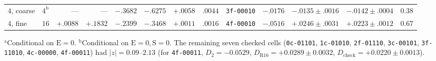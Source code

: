 \begin{table}[htbp]
\begin{tabular}{llrrrrrr|lrrrl}
$4$, coarse & $4^{\mathrm{b}}$ & --- & --- & $-.3682$ & $-.6275$ & $+.0058$ & $.0044$ & \texttt{3f-00010} & $-.0176$ & $-.0135 \pm .0016$ & $-.0142 \pm .0004$ & $0.38$\\
$4$, fine & $16$ & $+.0088$ & $+.1832$ & $-.2399$ & $-.3468$ & $+.0011$ & $.0016$ & \texttt{4f-00010} & $-.0516$ & $+.0246 \pm .0031$ & $+.0223 \pm .0012$ & $0.67$\\\bottomrule
\end{tabular}
\par\smallskip\raggedright\footnotesize
$^{\mathrm{a}}$Conditional on $\mathrm{E} = 0$. $^{\mathrm{b}}$Conditional on $\mathrm{E} = 0, \mathrm{S} = 0$. The remaining seven checked cells (\texttt{0c-01101}, \texttt{1c-01010}, \texttt{2f-01110}, \texttt{3c-00101}, \texttt{3f-11010}, \texttt{4c-00000}, \texttt{4f-00011}) had $|z| = 0.09$--$2.13$ (for \texttt{4f-00011}, $D_2 = -0.0529$, $D_{\mathrm{R16}} = +0.0289 \pm 0.0032$, $D_{\mathrm{check}} = +0.0220 \pm 0.0013$).
\end{table}

